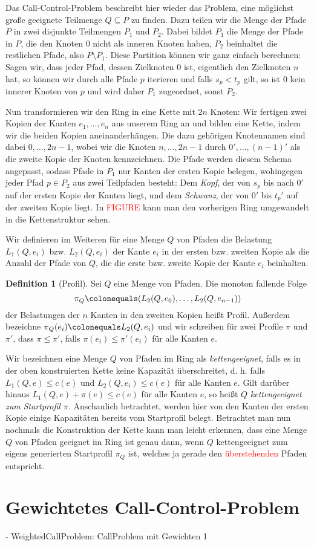 \documentclass[11pt]{article}
\theoremstyle{definition}
\newtheorem{definition}{Definition}[section]
\theoremstyle{theorem}
\theoremstyle{theorem}
\newcommand\todo[1]{\textcolor{red}{#1}}
\begin{document}
    Das Call-Control-Problem beschreibt hier wieder das Problem, eine möglichst große geeignete Teilmenge
    $Q \subseteq P$ zu finden.
    Dazu teilen wir die Menge der Pfade $P$ in zwei disjunkte Teilmengen $P_1$ und $P_2$.
    Dabei bildet $P_1$ die Menge der Pfade in $P$, die den Knoten $0$ nicht als inneren Knoten haben, $P_2$
    beinhaltet die restlichen Pfade, also $P \setminus P_1$.
    Diese Partition können wir ganz einfach berechnen:
    Sagen wir, dass jeder Pfad, dessen Zielknoten $0$ ist, eigentlich den Zielknoten $n$ hat, so können wir durch alle
    Pfade $p$ iterieren und falls $s_p < t_p$ gilt, so ist $0$ kein innerer Knoten von $p$ und wird daher $P_1$
    zugeordnet, sonst $P_2$.

    Nun transformieren wir den Ring in eine Kette mit $2n$ Knoten:
    Wir fertigen zwei Kopien der Kanten $e_1,\dotsc,e_n$ aus unserem Ring an und bilden eine Kette, indem wir die
    beiden Kopien aneinanderhängen.
    Die dazu gehörigen Knotennamen sind dabei $0, \dotsc, 2n-1$, wobei wir die Knoten $n, \dotsc, 2n-1$ durch
    $0', \dotsc, (n-1)'$ als die zweite Kopie der Knoten kennzeichnen.
    Die Pfade werden diesem Schema angepasst, sodass Pfade in $P_1$ nur Kanten der ersten Kopie belegen, wohingegen
    jeder Pfad $p \in P_2$ aus zwei Teilpfaden besteht: Dem {\em Kopf}, der von $s_p$ bis nach $0'$ auf der ersten
    Kopie der Kanten liegt, und dem {\em Schwanz}, der von $0'$ bis $t_p '$ auf der zweiten Kopie liegt.
    In \todo{FIGURE} kann man den vorherigen Ring umgewandelt in die Kettenstruktur sehen.

    Wir definieren im Weiteren für eine Menge $Q$ von Pfaden die Belastung $L_1(Q, e_i)$ bzw. $L_2(Q, e_i)$ der Kante
    $e_i$ in der ersten bzw. zweiten Kopie als die Anzahl der Pfade von $Q$, die die erste bzw. zweite Kopie der Kante
    $e_i$ beinhalten.
    \begin{definition}[Profil]
        Sei $Q$ eine Menge von Pfaden. Die monoton fallende Folge
        \[\pi_{Q}\colonequals  (L_2(Q, e_0), \dots, L_2(Q, e_{n-1}))\]
        der Belastungen der $n$ Kanten in den zweiten Kopien heißt Profil.
        Außerdem bezeichne $\pi_Q(e_i) \colonequals L_2(Q, e_i)$ und wir schreiben für zwei Profile $\pi$ und $\pi'$,
        dass $\pi \leq \pi'$, falls $\pi(e_i) \leq \pi'(e_i)$ für alle Kanten $e$.
    \end{definition}

    Wir bezeichnen eine Menge $Q$ von Pfaden im Ring als {\em kettengeeignet},
    falls es in der oben konstruierten Kette keine Kapazität überschreitet, d. h. falls $L_1(Q, e) \leq c(e)$ und
    $L_2(Q, e_i) \leq c(e)$ für alle Kanten $e$.
    Gilt darüber hinaus $L_1(Q, e) + \pi(e) \leq c(e)$ für alle Kanten $e$, so heißt $Q$ {\em kettengeeignet zum Startprofil $\pi$}.
    Anschaulich betrachtet, werden hier von den Kanten der ersten Kopie einige Kapazitäten bereits vom Startprofil belegt.
    Betrachtet man nun nochmals die Konstruktion der Kette kann man leicht erkennen, dass eine Menge $Q$ von Pfaden geeignet im
    Ring ist genau dann, wenn $Q$ kettengeeignet zum eigens generierten Startprofil $\pi_Q$ ist, welches ja gerade den
    \todo{überstehenden} Pfaden entspricht.






    \section{Gewichtetes Call-Control-Problem}\label{sec:weiteres}
    - WeightedCallProblem: CallProblem mit Gewichten 1
\end{document}
